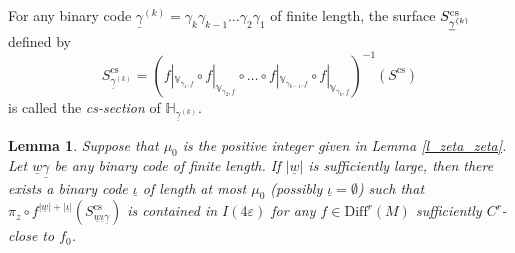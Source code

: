 \documentclass{amsart}
\newtheorem{lem}[thm]{Lemma}
\theoremstyle{definition}
\numberwithin{equation}{section}
\numberwithin{figure}{section}
\begin{document}
For any binary code $\underline{\gamma}^{(k)}=\gamma_k\gamma_{k-1}\dots \gamma_2\gamma_1$ of finite length, the 
surface $S_{\underline{\gamma}^{(k)}}^{\mathrm{cs}}\index{Scsgk@$S_{\underline{\gamma}^{(k)}}^{\mathrm{cs}}$}$ defined by 
$$S_{\underline{\gamma}^{(k)}}^{\mathrm{cs}}=(f|_{\mathbb{V}_{\gamma_1,f}}\circ f|_{\mathbb{V}_{\gamma_2,f}}\circ\dots \circ f|_{\mathbb{V}_{\gamma_{k-1},f}}\circ f|_{\mathbb{V}_{\gamma_k,f}})^{-1}(S^{\mathrm{cs}})$$
is called the \emph{cs-section} of $\mathbb{H}_{\underline{\gamma}^{(k)}}$.





\begin{lem}\label{l_fSw}
Suppose that $\mu_0$ is the positive integer given in Lemma \ref{l_zeta_zeta}.
Let $\underline{w}\underline{\gamma}$ be any binary code of finite length.
If $|\underline{w}|$ is sufficiently large, then there exists a binary code $\underline\iota$ of length at most $\mu_0$ 
(possibly $\underline\iota=\emptyset$) 
such that $\pi_z\circ f^{|\underline{w}|+|\underline\iota|}(S_{\underline{w}\underline\iota\underline{\gamma}}^{\mathrm{cs}})$ 
is contained in $I(4\varepsilon)$ 
for any $f\in\mathrm{Diff}^r(M)$ sufficiently $C^r$-close to $f_0$.
\end{lem}
\end{document}
